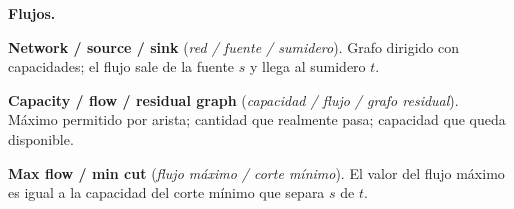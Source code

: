 \textbf{Flujos.}
\begin{props}
  \item \textbf{Network / source / sink} (\textit{red / fuente / sumidero}). Grafo dirigido con capacidades; el flujo sale de la fuente \(s\) y llega al sumidero \(t\).
  \item \textbf{Capacity / flow / residual graph} (\textit{capacidad / flujo / grafo residual}). Máximo permitido por arista; cantidad que realmente pasa; capacidad que queda disponible.
  \item \textbf{Max flow / min cut} (\textit{flujo máximo / corte mínimo}). El valor del flujo máximo es igual a la capacidad del corte mínimo que separa \(s\) de \(t\).
\end{props}

